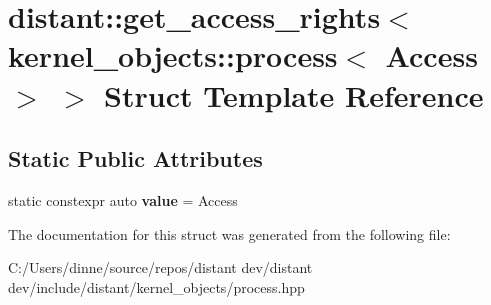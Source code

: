 \hypertarget{structdistant_1_1get__access__rights_3_01kernel__objects_1_1process_3_01_access_01_4_01_4}{}\section{distant\+:\+:get\+\_\+access\+\_\+rights$<$ kernel\+\_\+objects\+:\+:process$<$ Access $>$ $>$ Struct Template Reference}
\label{structdistant_1_1get__access__rights_3_01kernel__objects_1_1process_3_01_access_01_4_01_4}
\subsection*{Static Public Attributes}
\begin{DoxyCompactItemize}
\item 
\mbox{\label{structdistant_1_1get__access__rights_3_01kernel__objects_1_1process_3_01_access_01_4_01_4_a3d0fb6e2482b01322d332af09eecb34c}} 
static constexpr auto {\bfseries value} = Access
\end{DoxyCompactItemize}


The documentation for this struct was generated from the following file\+:\begin{DoxyCompactItemize}
\item 
C\+:/\+Users/dinne/source/repos/distant dev/distant dev/include/distant/kernel\+\_\+objects/process.\+hpp\end{DoxyCompactItemize}
